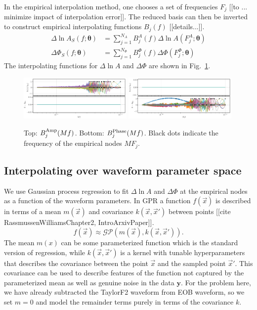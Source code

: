\documentclass[prd,aps,letter,twocolumn,floatfix,notitlepage,nofootinbib]{revtex4-1}
\def\btheta{\boldsymbol{\theta}}
\begin{document}
In the empirical interpolation method, one chooses a set of frequencies $F_j$ [[to ... minimize impact of interpolation error]].
The reduced basis can then be inverted to construct empirical interpolating functions $B_j(f)$ [[details...]].
\begin{subequations}
\label{eq:empinterpFinal}
\begin{align}
\Delta\ln A_S(f; \btheta ) & = \sum_{j=1}^{N_A} B_j^A(f) \Delta\ln A(F^A_j; \btheta) \\
\Delta\Phi_S(f; \btheta ) & = \sum_{j=1}^{N_\Phi} B_j^\Phi(f) \Delta\Phi(F^\Phi_j; \btheta)
\end{align}
\end{subequations}
The interpolating functions for $\Delta\ln A$ and $\Delta\Phi$ are shown in Fig.~\ref{fig:B}. 

\begin{figure}[htb]
\centering
\includegraphics[width=0.49\textwidth]{Bamp.png}
\includegraphics[width=0.49\textwidth]{Bphase.png}
\caption{Top: $B^{\rm Amp}_j(Mf)$. Bottom: $B^{\rm Phase}_j(Mf)$. Black dots indicate the frequency of the empirical nodes $MF_j$.}
\label{fig:B}
\end{figure}

\subsection{Interpolating over waveform parameter space}

We use Gaussian process regression to fit $\Delta\ln A$ and $\Delta\Phi$ at the empirical nodes as a function of
the waveform parameters. In GPR a function $f(\vec x)$ is described in terms of a mean $m(\vec x)$ and 
covariance $k(\vec x, \vec x')$ between points [[cite RassmussenWilliamsChapter2, IntroArxivPaper]].
\begin{equation}
f(\vec x) \approx \mathcal{GP}(m(\vec x), k(\vec x, \vec x')).
\end{equation}
The mean $m(x)$ can be some parameterized function which is the standard version of regression, 
while $k(\vec x, \vec x')$ is a kernel with tunable hyperparameters that describes the covariance between
the point $\vec x$ and the sampled point $\vec x'$. This covariance can be used to describe features of the function 
not captured by the parameterized mean as well as genuine noise in the data ${\bm y}$. 
For the problem here, we have already subtracted the 
TaylorF2 waveform from EOB waveform, so we set $m=0$ and model the remainder terms purely in terms 
of the covariance $k$. 
\end{document}

